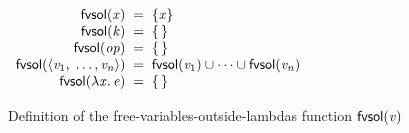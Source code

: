 \clearpage

\begin{figure}
$
\begin{array}{r@{\;\;}c@{\;\;}l@{\qquad}l}
  \freevarsoutsidelambdas{\ensuremath{\Varid{x}}} & = & \{ \ensuremath{\Varid{x}} \} \\
  \freevarsoutsidelambdas{\ensuremath{\Varid{k}}} & = & \{\,\} \\
  \freevarsoutsidelambdas{\ensuremath{\Varid{op}}} & = & \{\,\} \\
  \freevarsoutsidelambdas{\ensuremath{\langle{}\Varid{v}_{\mathrm{1}},\;\ldots,\Varid{v}_{\Varid{n}}\rangle}} & = & \freevarsoutsidelambdas{\ensuremath{\Varid{v}_{\mathrm{1}}}} \cup \cdots \cup \freevarsoutsidelambdas{\ensuremath{\Varid{v}_{\Varid{n}}}} \\
  \freevarsoutsidelambdas{\ensuremath{\lambda\Varid{x}.\,\Varid{e}}} & = & \{\,\} \\
\end{array}
$
\caption{Definition of the free-variables-outside-lambdas function $\mathsf{fvsol}(\mathit{v})$}
\label{fig:fvsol}
\end{figure}


